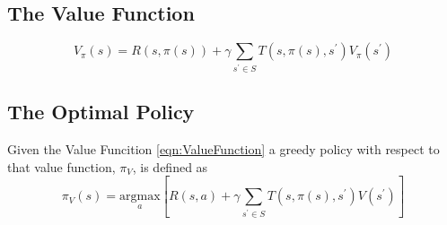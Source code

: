 \subsection{The Value Function}

\begin{equation}
	V_{\pi}(s) = R(s,\pi(s)) + \gamma \sum_{s^\prime \in S} T(s, \pi(s), s^\prime) V_{\pi}(s^\prime)
	\label{eqn:ValueFunction}
\end{equation}


\subsection{The Optimal Policy}

Given the Value Funcition \ref{eqn:ValueFunction} a greedy policy with respect to that value function, $\pi_V$, is defined as 
\begin{equation}
	\pi_V(s) = \underset{a}{\mathrm{argmax}}\left[R(s,a) + \gamma \sum_{s^\prime \in S} T(s, \pi(s), s^\prime) V(s^\prime) \right]
\end{equation}
